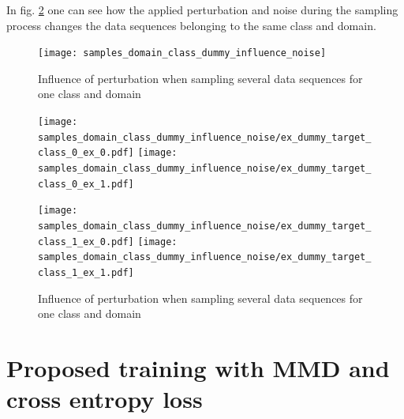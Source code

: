 In fig. \ref{fig:samples_domain_class_dummy_influence_noise} one can see how the applied perturbation and noise during the sampling process changes the data sequences belonging to the same class and domain. 


\begin{figure}[htpb]
  \centering
  \texttt{[image: samples\_domain\_class\_dummy\_influence\_noise]}
  \caption {Influence of perturbation when sampling several data sequences for one class and domain}
  \label{fig:samples_domain_class_dummy_influence_noise}
\end{figure}



\begin{figure}[p]
  \centering
  \texttt{[image: samples\_domain\_class\_dummy\_influence\_noise/ex\_dummy\_target\_class\_0\_ex\_0.pdf]}
  \hspace{.3cm}
  \texttt{[image: samples\_domain\_class\_dummy\_influence\_noise/ex\_dummy\_target\_class\_0\_ex\_1.pdf]}

  \vspace{.1cm}

  \texttt{[image: samples\_domain\_class\_dummy\_influence\_noise/ex\_dummy\_target\_class\_1\_ex\_0.pdf]}
  \hspace{.3cm}
  \texttt{[image: samples\_domain\_class\_dummy\_influence\_noise/ex\_dummy\_target\_class\_1\_ex\_1.pdf]}

  \caption{Influence of perturbation when sampling several data sequences for one class and domain}
  \label{fig:samples_domain_class_dummy_influence_noise}
\end{figure}



\section{Proposed training with MMD and cross entropy loss} \label{sec:Proposed_training}

